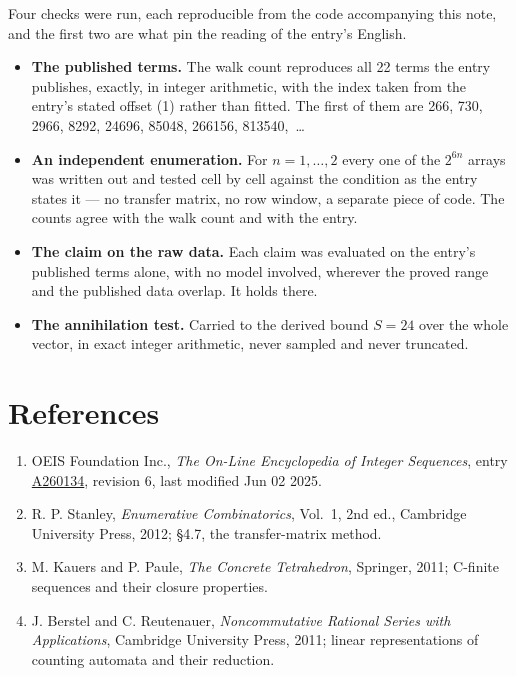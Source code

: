 \documentclass[11pt]{article}
\theoremstyle{definition}
\begin{document}
Four checks were run, each reproducible from the code accompanying this note, and the first two are what pin the reading of the entry's English.

\begin{itemize}

\item {\bfseries The published terms.} The walk count reproduces all 22 terms the entry publishes, exactly, in integer arithmetic, with the index taken from the entry's stated offset (1) rather than fitted. The first of them are 266, 730, 2966, 8292, 24696, 85048, 266156, 813540,~\dots

\item {\bfseries An independent enumeration.} For $n = 1,\dots,2$ every one of the $2^{6n}$ arrays was written out and tested cell by cell against the condition as the entry states it --- no transfer matrix, no row window, a separate piece of code. The counts agree with the walk count and with the entry.

\item {\bfseries The claim on the raw data.} Each claim was evaluated on the entry's published terms alone, with no model involved, wherever the proved range and the published data overlap. It holds there.

\item {\bfseries The annihilation test.} Carried to the derived bound $S = 24$ over the whole vector, in exact integer arithmetic, never sampled and never truncated.

\end{itemize}

\section{References}

\begin{enumerate}

\item OEIS Foundation Inc., \emph{The On-Line Encyclopedia of Integer Sequences}, entry \href{https://oeis.org/A260134}{A260134}, revision 6, last modified Jun 02 2025.

\item R. P. Stanley, \emph{Enumerative Combinatorics}, Vol.~1, 2nd ed., Cambridge University Press, 2012; \S4.7, the transfer-matrix method.

\item M. Kauers and P. Paule, \emph{The Concrete Tetrahedron}, Springer, 2011; C-finite sequences and their closure properties.

\item J. Berstel and C. Reutenauer, \emph{Noncommutative Rational Series with Applications}, Cambridge University Press, 2011; linear representations of counting automata and their reduction.

\end{enumerate}
\end{document}
